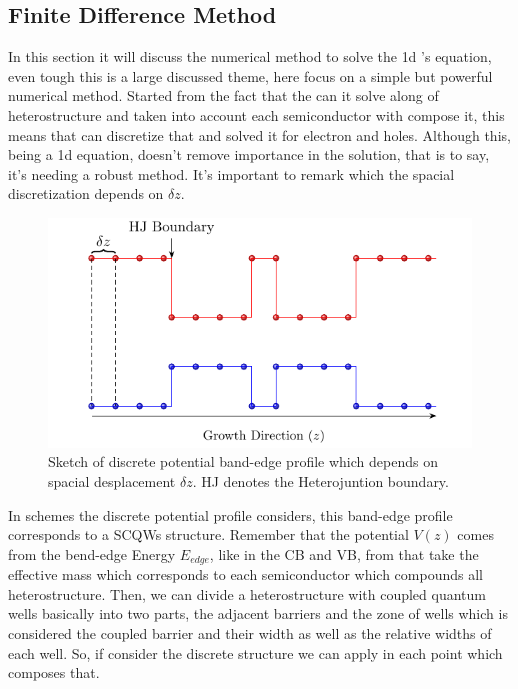 \subsection{Finite Difference Method}
\label{subsec:chapter-2-finite-difference-method}
\vspace{-10mm} 
In this section it will discuss the numerical method to solve the \gls{1d} \sch's equation, even tough this is a large discussed theme, here focus on a simple but powerful numerical method. Started from the fact that the  can it solve along of heterostructure and taken into account each semiconductor with compose it, this means that can discretize that and solved it for electron and holes. Although this, being a \gls{1d} equation, doesn't remove importance in the solution, that is to say, it's needing a robust method. It's important to remark which the spacial discretization depends on $\delta z$.
\begin{figure}[H]
	\centering
	\includegraphics[width=\textwidth]{../figures/chapter-2/numerical-calculations/out/fdm-potential-1}
	\caption{Sketch of discrete potential band-edge profile which depends on spacial desplacement $\delta z$. HJ denotes the Heterojuntion boundary.}
	\label{fig:chapter-2-sec-numerical-calculations-fdm-potential}
\end{figure}
In  schemes the discrete potential profile considers, this band-edge profile corresponds to a \gls{SCQWs} structure. Remember that the potential $V(z)$ comes from the bend-edge Energy $E_{edge}$, like in the \gls{CB} and \gls{VB}, from that take the effective mass which corresponds to each semiconductor which compounds all heterostructure. Then, we can divide a heterostructure with coupled quantum wells basically into two parts, the adjacent barriers and the zone of wells which is considered the coupled barrier and their width as well as the relative widths of each well. So, if consider the discrete structure we can apply  in each point which composes that. 

